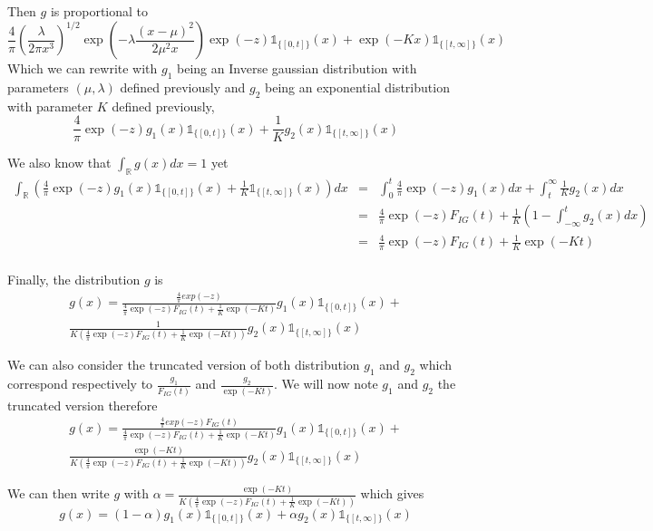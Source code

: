 Then $g$ is proportional to 
\[\frac{4}{\pi} \left( \frac{\lambda}{2\pi x^3} \right)^{1/2} \exp\left( -\lambda \frac{(x - \mu)^2}{2\mu^2 x} \right) \exp(-z) \mathbb{1}_{\{[0,t]\}}(x)+ \exp\left( -Kx\right) \mathbb{1}_{\{[t,\infty]\}}(x)\]
Which we can rewrite with $g_1$ being an Inverse gaussian distribution with parameters $(\mu,\lambda)$ defined previously and $g_2$ being an exponential distribution with parameter $K$ defined previously,
\[\frac{4}{\pi}\exp(-z) g_1(x) \mathbb{1}_{\{[0,t]\}}(x)+ \frac{1}{K}g_2(x)\mathbb{1}_{\{[t,\infty]\}}(x)\]

We also know that $\int_{\mathbb{R}} g(x)dx = 1$ yet
\begin{eqnarray*}
	\int_{\mathbb{R}}\left(\frac{4}{\pi}\exp(-z) g_1(x) \mathbb{1}_{\{[0,t]\}}(x)+ \frac{1}{K}\mathbb{1}_{\{[t,\infty]\}}(x)\right)dx &=& \int_{0}^t \frac{4}{\pi}\exp(-z) g_1(x)dx + \int_t^\infty \frac{1}{K}g_2(x)dx\\
	&=& \frac{4}{\pi} \exp(-z) F_{IG}(t) + \frac{1}{K} (1 - \int_{-\infty}^t g_2(x)dx)\\
	&=& \frac{4}{\pi} \exp(-z) F_{IG}(t) + \frac{1}{K} \exp(-Kt)\\
\end{eqnarray*}

Finally, the distribution $g$ is 
\begin{eqnarray*}
	g(x) = \frac{\frac{4}{\pi}exp(-z)}{\frac{4}{\pi} \exp(-z) F_{IG}(t) + \frac{1}{K} \exp(-Kt)}g_1(x) \mathbb{1}_{\{[0,t]\}}(x)+\\ \frac{1}{K(\frac{4}{\pi} \exp(-z) F_{IG}(t) + \frac{1}{K} \exp(-Kt))} g_2(x) \mathbb{1}_{\{[t,\infty]\}}(x)
\end{eqnarray*}


We can also consider the truncated version of both distribution $g_1$ and $g_2$ which correspond respectively to $\frac{g_1}{F_{IG}(t)}$ and $\frac{g_2}{\exp(-Kt)}$. We will now note $g_1$ and $g_2$ the truncated version therefore
\begin{eqnarray*}
	g(x) = \frac{\frac{4}{\pi}exp(-z)F_{IG}(t)}{\frac{4}{\pi} \exp(-z) F_{IG}(t) + \frac{1}{K} \exp(-Kt)}g_1(x) \mathbb{1}_{\{[0,t]\}}(x)+\\ \frac{\exp(-Kt)}{K(\frac{4}{\pi} \exp(-z) F_{IG}(t) + \frac{1}{K} \exp(-Kt))} g_2(x) \mathbb{1}_{\{[t,\infty]\}}(x)
\end{eqnarray*}


We can then write $g$ with $\alpha = \frac{\exp(-Kt)}{K(\frac{4}{\pi} \exp(-z) F_{IG}(t) + \frac{1}{K} \exp(-Kt))}$ which gives
\[g(x) = (1-\alpha) g_1(x)  \mathbb{1}_{\{[0,t]\}}(x) + \alpha g_2(x)  \mathbb{1}_{\{[t,\infty]\}}(x)\]

